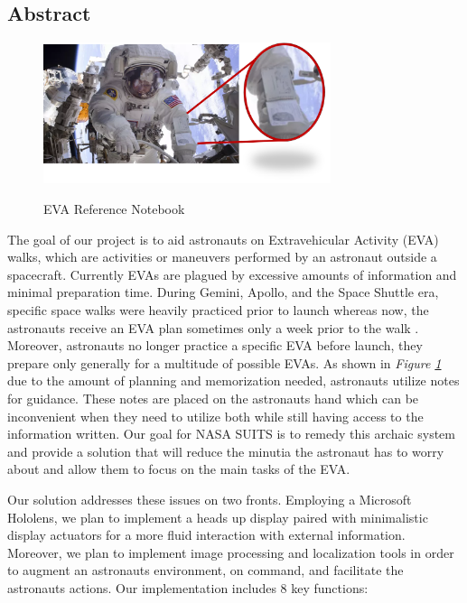\documentclass{article}
\let\Oldsubsection\subsection
\renewcommand{\subsection}{\FloatBarrier\Oldsubsection}
\begin{document}
\subsection{Abstract}

\begin{figure}[!htb]
  \centering
  \caption{EVA Reference Notebook}
  \includegraphics[width=0.75\textwidth]{assets/spacesuitdisplay.png}
  \label{fig:spacesuitdisplay}
\end{figure}

The goal of our project is to aid astronauts on Extravehicular Activity (EVA) walks, which are activities or maneuvers performed by an astronaut outside a spacecraft. Currently EVAs are plagued by excessive amounts of information and minimal preparation time. During Gemini, Apollo, and the Space Shuttle era, specific space walks were heavily practiced prior to launch whereas now, the astronauts receive an EVA plan sometimes only a week prior to the walk \autocite{mannedspaceflight}. Moreover, astronauts no longer practice a specific EVA before launch, they prepare only generally for a multitude of possible EVAs. As shown in \textit{Figure \ref{fig:spacesuitdisplay}} due to the amount of planning and memorization needed, astronauts utilize notes for guidance. These notes are placed on the astronauts hand which can be inconvenient when they need to utilize both while still having access to the information written. Our goal for NASA SUITS is to remedy this archaic system and provide a solution that will reduce the minutia the astronaut has to worry about and allow them to focus on the main tasks of the EVA.

Our solution addresses these issues on two fronts. Employing a Microsoft Hololens, we plan to implement a heads up display paired with minimalistic display actuators for a more fluid interaction with external information. Moreover, we plan to implement image processing and localization tools in order to augment an astronauts environment, on command, and facilitate the astronauts actions. Our implementation includes 8 key functions:
\end{document}
